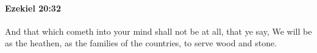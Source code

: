
		\paragraph{Ezekiel 20:32} %
			\label{EZEKIEL-20-32}

			And that which cometh into your mind shall not be at all, that ye say, We will be as the heathen, as the families of the countries, to serve wood and stone.


